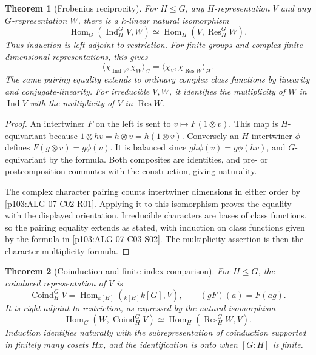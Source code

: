 \documentclass[11pt,oneside,openany]{book}
\newtheorem{theorem}{Theorem}[chapter]
\theoremstyle{definition}
\theoremstyle{remark}
\begin{document}
\begin{theorem}[Frobenius reciprocity]
\label{p103:ALG-07-C03-R02}
For \(H\le G\), any \(H\)-representation \(V\) and any
\(G\)-representation \(W\), there is a \(k\)-linear natural isomorphism
\[
 \operatorname{Hom}_G(\operatorname{Ind}_H^G V,W)
   \simeq \operatorname{Hom}_H(V,\operatorname{Res}_H^G W).
\]
Thus induction is left adjoint to restriction. For finite groups
and complex finite-dimensional representations, this gives
\[
 \langle\chi_{\operatorname{Ind}V},\chi_W\rangle_G
    =\langle\chi_V,\chi_{\operatorname{Res}W}\rangle_H.
\]
The same pairing equality extends to ordinary complex class functions
by linearity and conjugate-linearity. For irreducible \(V,W\), it
identifies the multiplicity of \(W\) in \(\operatorname{Ind}V\) with
the multiplicity of \(V\) in \(\operatorname{Res}W\).
\end{theorem}

\begin{proof}
An intertwiner \(F\) on the left is sent to \(v\mapsto F(1\otimes v)\).
This map is \(H\)-equivariant because
\(1\otimes hv=h\otimes v=h(1\otimes v)\). Conversely an
\(H\)-intertwiner \(\phi\) defines
\(F(g\otimes v)=g\phi(v)\). It is balanced since
\(gh\phi(v)=g\phi(hv)\), and \(G\)-equivariant by the formula.
Both composites are identities, and pre- or postcomposition
commutes with the construction, giving naturality.

The complex character pairing counts intertwiner dimensions in
either order by \ref{p103:ALG-07-C02-R01}. Applying it to this
isomorphism proves the equality with the displayed orientation.
Irreducible characters are bases of class functions, so the
pairing equality extends as stated, with induction on class
functions given by the formula in \ref{p103:ALG-07-C03-S02}.
The multiplicity assertion is then the character multiplicity formula.
\end{proof}

\begin{theorem}[Coinduction and finite-index comparison]
\label{p103:ALG-07-C03-S01}
For \(H\le G\), the coinduced representation of \(V\) is
\[
 \operatorname{Coind}_H^G V
  =\operatorname{Hom}_{k[H]}({}_{k[H]}k[G],V),
 \qquad (gF)(a)=F(ag).
\]
It is right adjoint to restriction, as expressed by the natural isomorphism
\[
 \operatorname{Hom}_G(W,\operatorname{Coind}_H^G V)
 \simeq \operatorname{Hom}_H(\operatorname{Res}_H^G W,V).
\]
Induction identifies naturally with the subrepresentation of
coinduction supported in finitely many cosets \(Hx\), and the
identification is onto when \([G:H]\) is finite.
\end{theorem}
\end{document}
